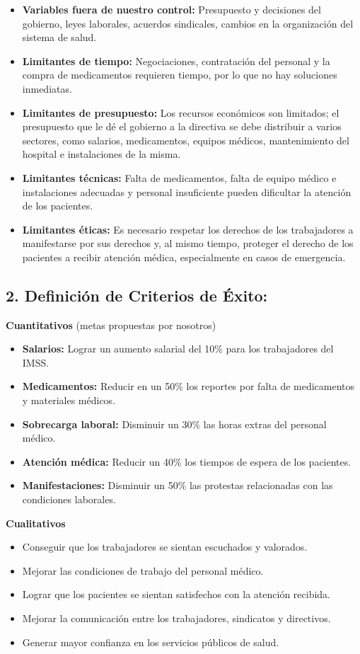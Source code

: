 \documentclass[12pt,letterpaper]{article}
\begin{document}
\begin{itemize}
  \item \textbf{Variables fuera de nuestro control:} Presupuesto y decisiones del gobierno, leyes laborales, acuerdos sindicales, cambios en la organización del sistema de salud.
  \item \textbf{Limitantes de tiempo:} Negociaciones, contratación del personal y la compra de medicamentos requieren tiempo, por lo que no hay soluciones inmediatas.
  \item \textbf{Limitantes de presupuesto:} Los recursos económicos son limitados; el presupuesto que le dé el gobierno a la directiva se debe distribuir a varios sectores, como salarios, medicamentos, equipos médicos, mantenimiento del hospital e instalaciones de la misma.
  \item \textbf{Limitantes técnicas:} Falta de medicamentos, falta de equipo médico e instalaciones adecuadas y personal insuficiente pueden dificultar la atención de los pacientes.
  \item \textbf{Limitantes éticas:} Es necesario respetar los derechos de los trabajadores a manifestarse por sus derechos y, al mismo tiempo, proteger el derecho de los pacientes a recibir atención médica, especialmente en casos de emergencia.
\end{itemize}

\subsection*{2. Definición de Criterios de Éxito:}

\textbf{Cuantitativos} (metas propuestas por nosotros)
\begin{itemize}
  \item \textbf{Salarios:} Lograr un aumento salarial del 10\% para los trabajadores del IMSS.
  \item \textbf{Medicamentos:} Reducir en un 50\% los reportes por falta de medicamentos y materiales médicos.
  \item \textbf{Sobrecarga laboral:} Disminuir un 30\% las horas extras del personal médico.
  \item \textbf{Atención médica:} Reducir un 40\% los tiempos de espera de los pacientes.
  \item \textbf{Manifestaciones:} Disminuir un 50\% las protestas relacionadas con las condiciones laborales.
\end{itemize}

\textbf{Cualitativos}
\begin{itemize}
  \item Conseguir que los trabajadores se sientan escuchados y valorados.
  \item Mejorar las condiciones de trabajo del personal médico.
  \item Lograr que los pacientes se sientan satisfechos con la atención recibida.
  \item Mejorar la comunicación entre los trabajadores, sindicatos y directivos.
  \item Generar mayor confianza en los servicios públicos de salud.
\end{itemize}
\end{document}
